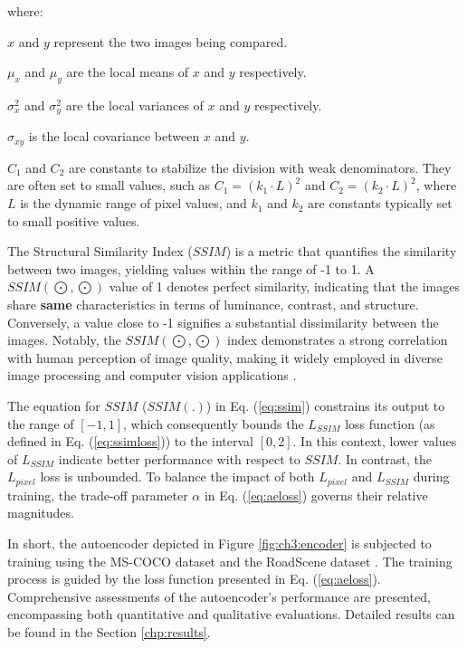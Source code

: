where:
\begin{list}{}{}
    \item\(x\) and \(y\) represent the two images being compared.
    \item\(\mu_x\) and \(\mu_y\) are the local means of \(x\) and \(y\) respectively.
    \item\(\sigma_x^2\) and \(\sigma_y^2\) are the local variances of \(x\) and \(y\) respectively.
    \item\(\sigma_{xy}\) is the local covariance between \(x\) and \(y\).
    \item\(C_1\) and \(C_2\) are constants to stabilize the division with weak denominators. They are often set to small values, such as \(C_1 = (k_1 \cdot L)^2\) and \(C_2 = (k_2 \cdot L)^2\), where \(L\) is the dynamic range of pixel values, and \(k_1\) and \(k_2\) are constants typically set to small positive values.
\end{list}

The Structural Similarity Index ($SSIM$) is a metric that quantifies the similarity between two images, yielding values within the range of -1 to 1. A $SSIM(\bigodot,\bigodot)$ value of 1 denotes perfect similarity, indicating that the images share \textbf{same} characteristics in terms of luminance, contrast, and structure. Conversely, a value close to -1 signifies a substantial dissimilarity between the images. Notably, the $SSIM(\bigodot,\bigodot)$ index demonstrates a strong correlation with human perception of image quality, making it widely employed in diverse image processing and computer vision applications \cite{ma2015perceptual}.

The equation for $SSIM$ ($SSIM(.)$) in Eq. (\ref{eq:ssim}) constrains its output to the range of $[-1,1]$, which consequently bounds the $L_{SSIM}$ loss function (as defined in Eq. (\ref{eq:ssimloss})) to the interval $[0,2]$. In this context, lower values of $L_{SSIM}$ indicate better performance with respect to $SSIM$. In contrast, the $L_{pixel}$ loss is unbounded. To balance the impact of both $L_{pixel}$ and $L_{SSIM}$ during training, the trade-off parameter $\alpha$ in Eq. (\ref{eq:aeloss}) governs their relative magnitudes.

In short, the autoencoder depicted in Figure \ref{fig:ch3:encoder} is subjected to training using the MS-COCO dataset \cite{lin2014microsoft} and the RoadScene dataset \cite{xu2020aaai}. The training process is guided by the loss function presented in Eq. (\ref{eq:aeloss}). Comprehensive assessments of the autoencoder's performance are presented, encompassing both quantitative and qualitative evaluations. Detailed results can be found in the Section \ref{chp:results}.

